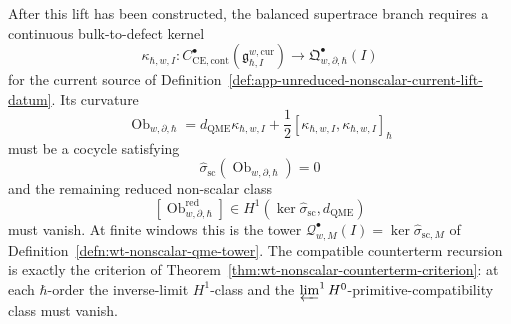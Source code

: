 \documentclass[11pt]{memoir}
\begin{document}
\begin{prob}
  After this lift has been constructed, the balanced supertrace branch
  requires a continuous bulk-to-defect kernel
  \[
    \kappa_{\hbar,w,I}\colon
    C^\bullet_{\mathrm{CE},\mathrm{cont}}
    (\mathfrak g^{w,\mathrm{cur}}_{\hbar,I})
    \longrightarrow
    \mathfrak Q^\bullet_{w,\partial,\hbar}(I)
  \]
  for the current source of
  Definition~\ref{def:app-unreduced-nonscalar-current-lift-datum}.  Its
  curvature
  \[
    \operatorname{Ob}_{w,\partial,\hbar}
      =
      d_{\mathrm{QME}}\kappa_{\hbar,w,I}
      +\frac12[\kappa_{\hbar,w,I},\kappa_{\hbar,w,I}]_\hbar
  \]
  must be a cocycle satisfying
  \[
    \widehat\sigma_{\mathrm{sc}}
      (\operatorname{Ob}_{w,\partial,\hbar})=0
  \]
  and the remaining reduced non-scalar class
  \[
    [\operatorname{Ob}^{\mathrm{red}}_{w,\partial,\hbar}]
      \in
      H^1\!\left(
        \ker\widehat\sigma_{\mathrm{sc}},
        d_{\mathrm{QME}}
      \right)
  \]
  must vanish.  At finite windows this is the tower
  \(\mathcal Q^\bullet_{w,M}(I)=\ker\widehat\sigma_{\mathrm{sc},M}\) of
  Definition~\ref{defn:wt-nonscalar-qme-tower}.  The compatible
  counterterm recursion is exactly the criterion of
  Theorem~\ref{thm:wt-nonscalar-counterterm-criterion}: at each
  \(\hbar\)-order the inverse-limit \(H^1\)-class and the
  \(\varprojlim^1 H^0\)-primitive-compatibility class must vanish.


\end{prob}
\end{document}
